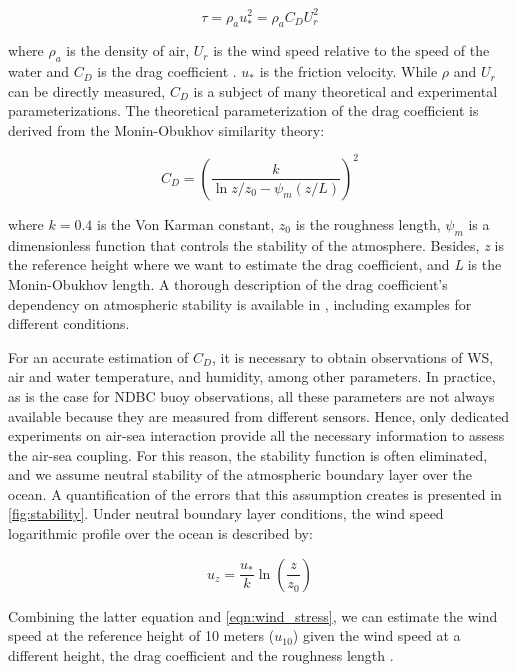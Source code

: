 \begin{equation}
\tau = \rho_{a} u_{*}^{2}  = \rho_{a}  C_{D} U_{r}^{2}
\label{eqn:wind_stress}
\end{equation}

where $\rho_{a}$ is the density of air, $U_{r}$ is the wind speed relative to the speed of the water and $C_{D}$ is the drag coefficient \cite{Edson2013}. $u_{*}$ is the friction velocity. While $\rho$ and $U_{r}$ can be directly measured, $C_{D}$ is a subject of many theoretical and experimental  parameterizations. The theoretical parameterization of the drag coefficient is derived from the Monin-Obukhov similarity theory:

\begin{equation}
C_{D} = \left( \frac{k}{\ln{z/z_{0}} - \psi_{m}(z/L)} \right)^2
\label{eqn:cd_non_neutral}
\end{equation}

where $k=0.4$ is the Von Karman constant, $z_{0}$ is the roughness length, $\psi_{m}$ is a dimensionless function that controls the stability of the atmosphere. Besides, \emph{z} is the reference height where we want to estimate the drag coefficient, and \emph{L} is the Monin-Obukhov length. A thorough description of the drag coefficient's dependency on atmospheric stability is available in \cite{Smith1988}, including examples for different conditions. 


For an accurate estimation of $C_{D}$, it is necessary to obtain observations of WS, air and water temperature, and humidity, among other parameters. In practice, as is the case for NDBC buoy observations, all these parameters are not always available because they are measured from different sensors. Hence, only dedicated experiments on air-sea interaction provide all the necessary information to assess the air-sea coupling. For this reason, the stability function is often eliminated, and we assume neutral stability of the atmospheric boundary layer over the ocean. A quantification of the errors that this assumption creates is presented in \ref{fig:stability}. Under neutral boundary layer conditions, the wind speed logarithmic profile over the ocean is described by:

\begin{equation}
u_{z} = \frac{u_{*}}{k} \ln\left({\frac{z}{z_{0}}}\right)
\label{eqn:log_profile}
\end{equation}

Combining the latter equation and \ref{eqn:wind_stress}, we can estimate the wind speed at the reference height of 10 meters ($u_{10}$) given the wind speed at a different height, the drag coefficient and the roughness length \cite{Young1999b}. 


